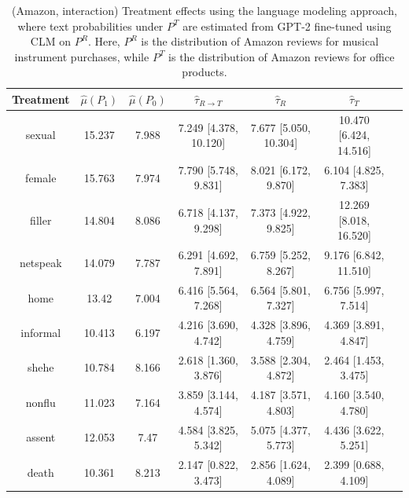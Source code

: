\documentclass{article}
\begin{document}
\begin{table}[!ht]
\centering
\begin{tabular}{c|cccccc}
\toprule
    Treatment   &   $\hat{\mu}(P_1)$ &   $\hat{\mu}(P_0)$ & $\hat{\tau}_{R \rightarrow T}$   & $\hat{\tau}_R$        & $\hat{\tau}_T$         \\
\midrule
    sexual      &             15.237 &              7.988 & 7.249 [4.378, 10.120]            & 7.677 [5.050, 10.304] & 10.470 [6.424, 14.516] \\
    female      &             15.763 &              7.974 & 7.790 [5.748, 9.831]             & 8.021 [6.172, 9.870]  & 6.104 [4.825, 7.383]   \\
    filler      &             14.804 &              8.086 & 6.718 [4.137, 9.298]             & 7.373 [4.922, 9.825]  & 12.269 [8.018, 16.520] \\
    netspeak    &             14.079 &              7.787 & 6.291 [4.692, 7.891]             & 6.759 [5.252, 8.267]  & 9.176 [6.842, 11.510]  \\
    home        &             13.42  &              7.004 & 6.416 [5.564, 7.268]             & 6.564 [5.801, 7.327]  & 6.756 [5.997, 7.514]   \\
    informal    &             10.413 &              6.197 & 4.216 [3.690, 4.742]             & 4.328 [3.896, 4.759]  & 4.369 [3.891, 4.847]   \\
    shehe       &             10.784 &              8.166 & 2.618 [1.360, 3.876]             & 3.588 [2.304, 4.872]  & 2.464 [1.453, 3.475]   \\
    nonflu      &             11.023 &              7.164 & 3.859 [3.144, 4.574]             & 4.187 [3.571, 4.803]  & 4.160 [3.540, 4.780]   \\
    assent      &             12.053 &              7.47  & 4.584 [3.825, 5.342]             & 5.075 [4.377, 5.773]  & 4.436 [3.622, 5.251]   \\
    death       &             10.361 &              8.213 & 2.147 [0.822, 3.473]             & 2.856 [1.624, 4.089]  & 2.399 [0.688, 4.109]   \\
\bottomrule
\end{tabular}
\caption{(Amazon, interaction) Treatment effects using the language modeling approach, where text probabilities under $P^T$ are estimated from GPT-2 fine-tuned using CLM on $P^R$. Here, $P^R$ is the distribution of Amazon reviews for musical instrument purchases, while $P^T$ is the distribution of Amazon reviews for office products.}
\label{tab:results_clm_gpt2_amazon_synthetic_interaction_finetuned_pr}
\end{table}
\end{document}
